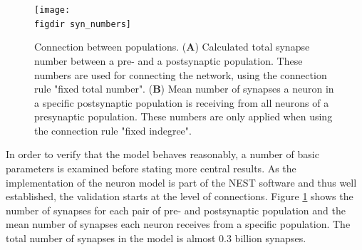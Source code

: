 \begin{figure}[tb]
    \centering
    \texttt{[image: \\figdir syn\_numbers]}
    \caption[Connection between populations]{
        Connection between populations.
        (\textbf{A}) Calculated total synapse number between a pre- 
        and a postsynaptic population. These numbers are used for connecting the network, 
        using the connection rule "fixed total number". (\textbf{B}) Mean number of synapses
        a neuron in a specific postsynaptic population is receiving from all neurons of a 
        presynaptic population. These numbers are only applied when using the connection
        rule "fixed indegree". %
    }
    \label{fig:syn_numbers}
\end{figure}
In order to verify that the model behaves reasonably, a number of basic parameters 
is examined before stating more central results. As the implementation of the neuron model
is part of the NEST software and thus well established, the validation starts at the level 
of connections. Figure \ref{fig:syn_numbers} shows the number of synapses for each pair 
of pre- and postsynaptic population and 
the mean number of synapses each neuron receives from a specific population. The total number 
of synapses in the model is almost 0.3 billion synapses.  


